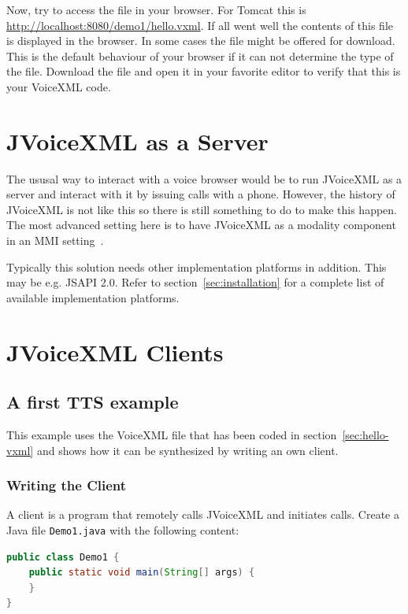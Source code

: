 \documentclass[11pt,a4paper]{book}
\begin{document}
Now, try to access the file in your browser. For Tomcat this is
\url{http://localhost:8080/demo1/hello.vxml}. If all went well the
contents of this file is displayed in the browser. In some cases the file
might be offered for download. This is the default behaviour of your browser if
it can not determine the type of the file. Download the file and open it in your
favorite editor to verify that this is your VoiceXML code.


\chapter{JVoiceXML as a Server}
\label{cha:callmanager}

The ususal way to interact with a voice browser would be to run JVoiceXML as a
server and interact with it by issuing calls with a phone. However, the history
of JVoiceXML is not like this so there is still something to do to make this
happen. The most advanced setting here is to have JVoiceXML as a modality
component in an MMI setting~\cite{w3c:mmi}.

Typically this solution needs other implementation platforms in addition. This
may be e.g. JSAPI 2.0. Refer to section~\ref{sec:installation} for a complete
list of available implementation platforms.

\chapter{JVoiceXML Clients}
\label{cha:programmatic-approach}

\section{A first TTS example}
\label{sec:first-tts-example}

This example uses the VoiceXML file that has been coded in
section~\ref{sec:hello-vxml} and shows how it can be synthesized by writing an
own client.

\subsection{Writing the Client}

A client is a program that remotely calls JVoiceXML and initiates calls. Create 
a Java file \texttt{Demo1.java} with the following content:

\begin{lstlisting}[language=Java]
public class Demo1 {
    public static void main(String[] args) {
    }
}
\end{lstlisting}
\end{document}
